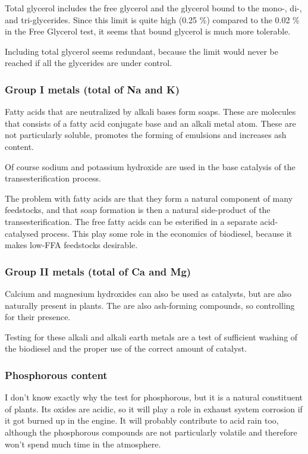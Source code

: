Total glycerol includes the free glycerol and the glycerol bound to the mono-, di-, and tri-glycerides. Since this limit is quite high (0.25 \%) compared to the 0.02 \% in the Free Glycerol test, it seems that bound glycerol is much more tolerable. 

Including total glycerol seems redundant, because the limit would never be reached if all the glycerides are under control.

\subsubsection{Group I metals (total of Na and K)}

Fatty acids that are neutralized by alkali bases form soaps. These are molecules that consists of a fatty acid conjugate base and an alkali metal atom. These are not particularly soluble, promotes the forming of emulsions and increases ash content. 

Of course sodium and potassium hydroxide are used in the base catalysis of the transesterification process. 

The problem with fatty acids are that they form a natural component of many feedstocks, and that soap formation is then a natural side-product of the transesterification. The free fatty acids can be esterified in a separate acid-catalysed process. This play some role in the economics of biodiesel, because it makes low-FFA feedstocks desirable.

\subsubsection{Group II metals (total of Ca and Mg)}

Calcium and magnesium hydroxides can also be used as catalysts, but are also naturally present in plants. The are also ash-forming compounds, so controlling for their presence.

Testing for these alkali and alkali earth metals are a test of sufficient washing of the biodiesel and the proper use of the correct amount of catalyst. 

\subsubsection{Phosphorous content}

I don't know exactly why the test for phosphorous, but it is a natural constituent of plants. Its oxides are acidic, so it will play a role in exhaust system corrosion if it got burned up in the engine. It will probably contribute to acid rain too, although the phosphorous compounds are not particularly volatile and therefore won't spend much time in the atmosphere.

